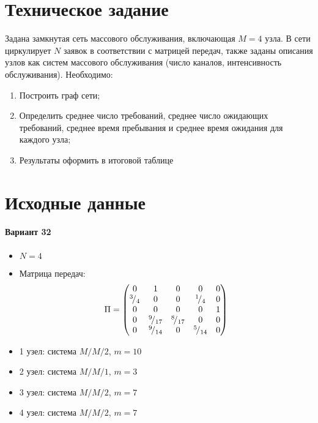 





\tableofcontents
\listoftables
\listoffigures
\newpage

\section{Техническое задание}

Задана замкнутая сеть массового обслуживания, включающая $M = 4$ узла. В сети циркулирует $N$ заявок в соответствии с матрицей передач, также заданы описания узлов как систем массового обслуживания (число каналов, интенсивность обслуживания). Необходимо:
\begin{enumerate}
	\item Построить граф сети;
	\item Определить среднее число требований, среднее число ожидающих требований, среднее время пребывания и среднее время ожидания для каждого узла;
	\item Результаты оформить в итоговой таблице
\end{enumerate}

\section{Исходные данные}

\paragraph{Вариант 32}

\begin{itemize}
	\item $N = 4$
	\item Матрица передач:
	\begin{displaymath}
		\Pi = \begin{pmatrix}
			0 & 1 & 0 & 0 & 0 \\
			{}^{3}\!/_{4} & 0 & 0 & {}^{1}\!/_{4} & 0 \\
			0 & 0 & 0 & 0 & 1 \\
			0 & {}^{9}\!/_{17} & {}^{8}\!/_{17} & 0 & 0 \\
			0 & {}^{9}\!/_{14} & 0 & {}^{5}\!/_{14} & 0
		\end{pmatrix}
	\end{displaymath}
	\item 1 узел: система $M/M/2$, $m = 10$
	\item 2 узел: система $M/M/1$, $m = 3$
	\item 3 узел: система $M/M/2$, $m = 7$
	\item 4 узел: система $M/M/2$, $m = 7$
\end{itemize}

